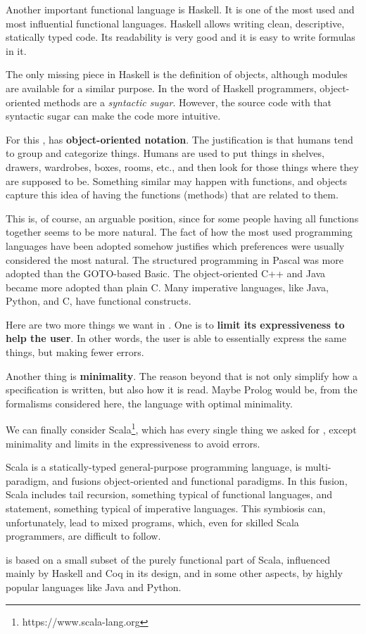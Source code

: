 Another important functional language is Haskell.
It is one of the most used and most influential functional languages.
Haskell allows writing clean, descriptive, statically typed code.
Its readability is very good and it is easy to write formulas in it.

The only missing piece in Haskell is the definition of objects, although modules are available for a similar purpose.
In the word of Haskell programmers, object-oriented methods are a \textit{syntactic sugar}.
However, the source code with that syntactic sugar can make the code more intuitive.

For this \Soda, has \textbf{object-oriented notation}.
The justification is that humans tend to group and categorize things. %
Humans are used to put things in shelves, drawers, wardrobes, boxes, rooms, etc., and then look for those things where they are supposed to be.
Something similar may happen with functions, and objects capture this idea of having the functions (methods) that are related to them.

This is, of course, an arguable position, since for some people having all functions together seems to be more natural.
The fact of how the most used programming languages have been adopted somehow justifies which preferences were usually considered the most natural.
The structured programming in Pascal was more adopted than the GOTO-based Basic.
The object-oriented C++ and Java became more adopted than plain C.
Many imperative languages, like Java, Python, and C, have functional constructs.

Here are two more things we want in \Soda.
One is to \textbf{limit its expressiveness to help the user}.
In other words, the user is able to essentially express the same things, but making fewer errors.

Another thing is \textbf{minimality}.
The reason beyond that is not only simplify how a specification is written, but also how it is read.
Maybe Prolog would be, from the formalisms considered here, the language with optimal minimality.

We can finally consider Scala\footnote{https://www.scala-lang.org}, which has every single thing we asked for \Soda, except minimality and limits in the expressiveness to avoid errors.

Scala is a statically-typed general-purpose programming language, is multi-paradigm, and fusions object-oriented and functional paradigms.
In this fusion, Scala includes tail recursion, something typical of functional languages, and \scalawhile statement, something typical of imperative languages.
This symbiosis can, unfortunately, lead to mixed programs, which, even for skilled Scala programmers, are difficult to follow.

\Soda is based on a small subset of the purely functional part of Scala, influenced mainly by Haskell and Coq in its design, and in some other aspects, by highly popular languages like Java and Python.

